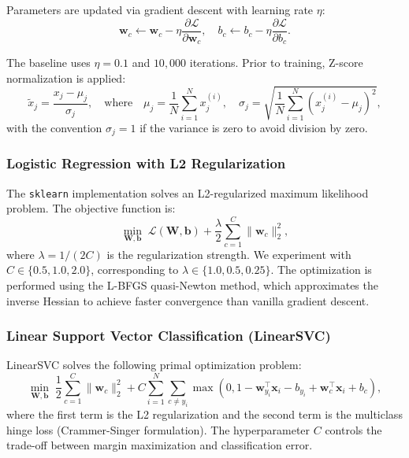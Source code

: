 \documentclass[onecolumn,a4paper,12pt]{IEEEtran}
\begin{document}
Parameters are updated via gradient descent with learning rate $\eta$:
\begin{equation}
\mathbf{w}_c \leftarrow \mathbf{w}_c - \eta \frac{\partial \mathcal{L}}{\partial \mathbf{w}_c}, \quad b_c \leftarrow b_c - \eta \frac{\partial \mathcal{L}}{\partial b_c}.
\end{equation}

The baseline uses $\eta=0.1$ and $10{,}000$ iterations. Prior to training, Z-score normalization is applied:
\begin{equation}
\tilde{x}_j = \frac{x_j - \mu_j}{\sigma_j}, \quad \text{where} \quad \mu_j = \frac{1}{N}\sum_{i=1}^{N} x_j^{(i)}, \quad \sigma_j = \sqrt{\frac{1}{N}\sum_{i=1}^{N} (x_j^{(i)} - \mu_j)^2},
\end{equation}
with the convention $\sigma_j = 1$ if the variance is zero to avoid division by zero.

\subsubsection{Logistic Regression with L2 Regularization}

The \texttt{sklearn} implementation solves an L2-regularized maximum likelihood problem. The objective function is:
\begin{equation}
\min_{\mathbf{W}, \mathbf{b}} \; \mathcal{L}(\mathbf{W}, \mathbf{b}) + \frac{\lambda}{2} \sum_{c=1}^{C} \|\mathbf{w}_c\|_2^2,
\end{equation}
where $\lambda = 1/(2C)$ is the regularization strength. We experiment with $C \in \{0.5, 1.0, 2.0\}$, corresponding to $\lambda \in \{1.0, 0.5, 0.25\}$. The optimization is performed using the L-BFGS quasi-Newton method, which approximates the inverse Hessian to achieve faster convergence than vanilla gradient descent.

\subsubsection{Linear Support Vector Classification (LinearSVC)}

LinearSVC solves the following primal optimization problem:
\begin{equation}
\min_{\mathbf{W}, \mathbf{b}} \; \frac{1}{2}\sum_{c=1}^{C} \|\mathbf{w}_c\|_2^2 + C \sum_{i=1}^{N} \sum_{c \neq y_i} \max\left(0, 1 - \mathbf{w}_{y_i}^{\top}\mathbf{x}_i - b_{y_i} + \mathbf{w}_c^{\top}\mathbf{x}_i + b_c\right),
\end{equation}
where the first term is the L2 regularization and the second term is the multiclass hinge loss (Crammer-Singer formulation). The hyperparameter $C$ controls the trade-off between margin maximization and classification error.
\end{document}
